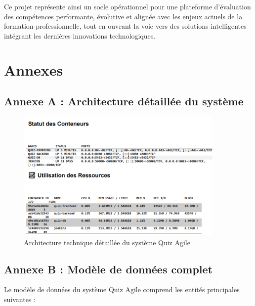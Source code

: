 \documentclass[12pt,a4paper]{report}
\begin{document}
\medskip
\noindent
Ce projet représente ainsi un socle opérationnel pour une plateforme d'évaluation des compétences performante, évolutive et alignée avec les enjeux actuels de la formation professionnelle, tout en ouvrant la voie vers des solutions intelligentes intégrant les dernières innovations technologiques.


\cleardoublepage
\chapter*{Annexes}

\section*{Annexe A : Architecture détaillée du système}

\begin{figure}[H]
\centering
\includegraphics[width=0.9\textwidth]{latex_media/media/image40.png}
\caption{Architecture technique détaillée du système Quiz Agile}
\label{fig:architecture-detaillee}
\end{figure}

\section*{Annexe B : Modèle de données complet}

Le modèle de données du système Quiz Agile comprend les entités principales suivantes :
\end{document}
